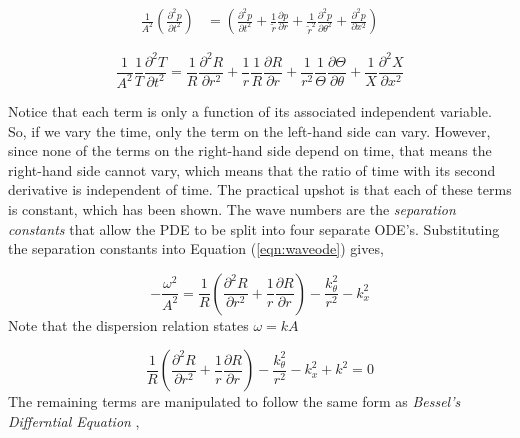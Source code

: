 



\begin{align*} 
    \frac{1}{A^2}\left(
        \frac{\partial^2 {p}}{\partial t^2}
    \right) &= 
        \left(
            \frac{\partial^2 {p}}{\partial t^2} + 
            \frac{1}{\tilde{r}}\frac{\partial p}{\partial r} +
            \frac{1}{\tilde{r}^2} \frac{\partial^2 p}{\partial \theta^2} + 
            \frac{\partial^2 p}{\partial x^2} 
        \right) 
\end{align*} 

\begin{equation}
    \frac{1}{A^2} \frac{1}{T}\frac{\partial^2 T}{\partial t^2} = 
    \frac{1}{R}\frac{\partial^2 R}{\partial r^2 } +
    \frac{1}{r}\frac{1}{R}\frac{\partial R}{\partial r}  + 
    \frac{1}{r^2}\frac{1}{\Theta}\frac{\partial \Theta}{\partial \theta} + 
    \frac{1}{X}\frac{\partial^2 X}{\partial x^2}
    \label{eqn:waveode}
\end{equation}

Notice that each term is only a function of its associated independent variable.
So, if we vary the time, only the term on the left-hand side can vary. However,
since none of the terms on the right-hand side depend on time, that means the
right-hand side cannot vary, which means that the ratio of time with its second
derivative is independent of time. The practical upshot is that each of these 
terms is constant, which has been shown. The wave numbers are the \textit{separation constants} 
that allow the PDE to be split into four separate ODE's. Substituting the separation constants 
into Equation (\ref{eqn:waveode}) gives, 


\begin{equation}
    -\frac{\omega^2}{A^2}  = 
    \frac{1}{R}
    \left(      
    \frac{\partial^2 R}{\partial r^2 } +
    \frac{1}{r}\frac{\partial R}{\partial r}  
\right) -
    \frac{k_{\theta}^2}{r^2}-  
    k_x^2
    \label{eqn:waveode2}
\end{equation}
Note that the dispersion relation states $\omega = k A$

\begin{equation}
    \frac{1}{R}
    \left(      
    \frac{\partial^2 R}{\partial r^2 } +
    \frac{1}{r}\frac{\partial R}{\partial r}  
\right) -
    \frac{k_{\theta}^2}{r^2}-  
    k_x^2 + k^2 = 0
    \label{eqn:waveode3}
\end{equation}
The remaining terms are manipulated to follow the same form as \textit{Bessel's Differntial 
Equation} ,

